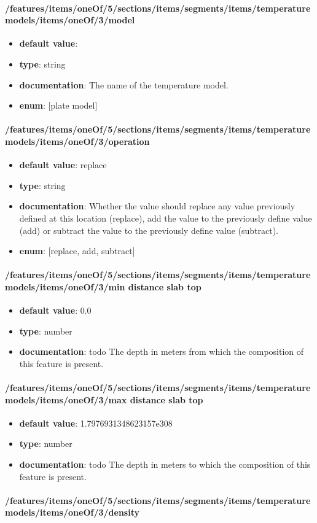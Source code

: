 \paragraph{/features/items/oneOf/5/sections/items/segments/items/temperature models/items/oneOf/3/model}
\begin{itemize}\item {\bf default value}: 
\item {\bf type}: string
\item {\bf documentation}: The name of the temperature model.
\item {\bf enum}: [plate model]\end{itemize}\paragraph{/features/items/oneOf/5/sections/items/segments/items/temperature models/items/oneOf/3/operation}
\begin{itemize}\item {\bf default value}: replace
\item {\bf type}: string
\item {\bf documentation}: Whether the value should replace any value previously defined at this location (replace), add the value to the previously define value (add) or subtract the value to the previously define value (subtract).
\item {\bf enum}: [replace, add, subtract]\end{itemize}\paragraph{/features/items/oneOf/5/sections/items/segments/items/temperature models/items/oneOf/3/min distance slab top}
\begin{itemize}\item {\bf default value}: 0.0
\item {\bf type}: number
\item {\bf documentation}: todo The depth in meters from which the composition of this feature is present.
\end{itemize}\paragraph{/features/items/oneOf/5/sections/items/segments/items/temperature models/items/oneOf/3/max distance slab top}
\begin{itemize}\item {\bf default value}: 1.7976931348623157e308
\item {\bf type}: number
\item {\bf documentation}: todo The depth in meters to which the composition of this feature is present.
\end{itemize}\paragraph{/features/items/oneOf/5/sections/items/segments/items/temperature models/items/oneOf/3/density}
